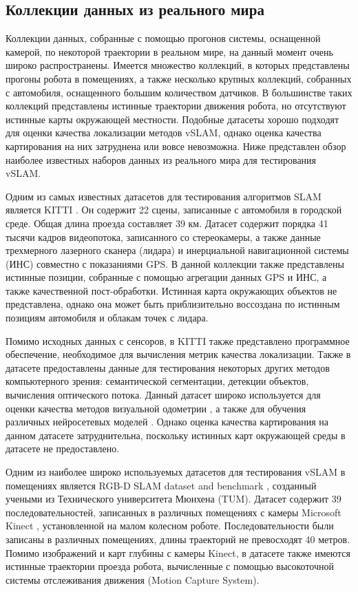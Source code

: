 \documentclass{mipt-thesis-ms}
\begin{document}
	\subsection{Коллекции данных из реального мира}
	
	Коллекции данных, собранные с помощью прогонов системы, оснащенной камерой, по некоторой траектории в реальном мире, на данный момент очень широко распространены. Имеется множество коллекций, в которых представлены прогоны робота в помещениях, а также несколько крупных коллекций, собранных с автомобиля, оснащенного большим количеством датчиков. В большинстве таких коллекций представлены истинные траектории движения робота, но отсутствуют истинные карты окружающей местности. Подобные датасеты хорошо подходят для оценки качества локализации методов vSLAM, однако оценка качества картирования на них затруднена или вовсе невозможна. Ниже представлен обзор наиболее известных наборов данных из реального мира для тестирования vSLAM.
	
	Одним из самых известных датасетов для тестирования алгоритмов SLAM является KITTI \cite{geiger2012we}. Он содержит 22 сцены, записанные с автомобиля в городской среде. Общая длина проезда составляет 39 км. Датасет содержит порядка 41 тысячи кадров видеопотока, записанного со стереокамеры, а также данные трехмерного лазерного сканера (лидара) и инерциальной навигационной системы (ИНС) совместно с показаниями GPS. В данной коллекции также представлены истинные позиции, собранные с помощью агрегации данных GPS и ИНС, а также качественной пост-обработки. Истинная карта окружающих объектов не представлена, однако она может быть приблизительно воссоздана по истинным позициям автомобиля и облакам точек с лидара.
	
	Помимо исходных данных с сенсоров, в KITTI также представлено программное обеспечение, необходимое для вычисления метрик качества локализации. Также в датасете предоставлены данные для тестирования некоторых других методов компьютерного зрения: семантической сегментации, детекции объектов, вычисления оптического потока. Данный датасет широко используется для оценки качества методов визуальной одометрии \cite{geiger2015kitti}, а также для обучения различных нейросетевых моделей \cite{li2018megadepth} \cite{zhou2017unsupervised} \cite{patil2020don}. Однако оценка качества картирования на данном датасете затруднительна, поскольку истинных карт окружающей среды в датасете не предоставлено.
	
	Одним из наиболее широко используемых датасетов для тестирования vSLAM в помещениях является RGB-D SLAM dataset and benchmark \cite{sturm2012benchmark}, созданный учеными из Технического университета Мюнхена (TUM). Датасет содержит 39 последовательностей, записанных в различных помещениях с камеры Microsoft Kinect \cite{zhang2012microsoft}, установленной на малом колесном роботе. Последовательности были записаны в различных помещениях, длины траекторий не превосходят 40 метров. Помимо изображений и карт глубины с камеры Kinect, в датасете также имеются истинные траектории проезда робота, вычисленные с помощью высокоточной системы отслеживания движения (Motion Capture System).
	
\end{document}
